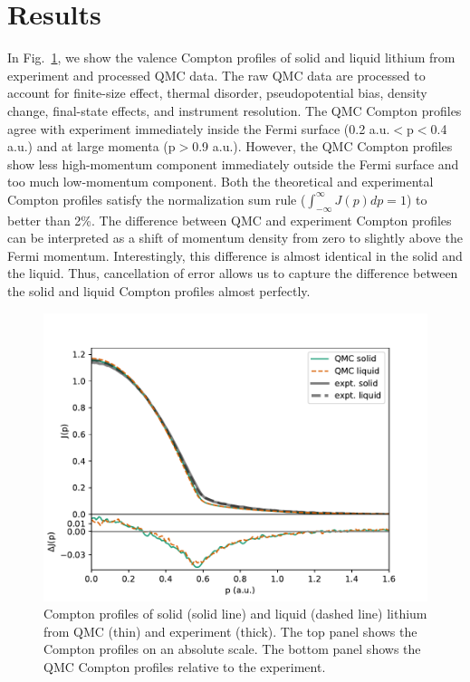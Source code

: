 \documentclass[aps,prb,showpacs,preprintnumbers,amsmath,amssymb,superscriptaddress,twocolumn]{revtex4-1}
\begin{document}
\section{Results} \label{sec:results}

In Fig.~\ref{fig:sl-jp-djp}, we show the valence Compton profiles of solid and liquid lithium from experiment and processed QMC data. The raw QMC data are processed to account for finite-size effect, thermal disorder, pseudopotential bias, density change, final-state effects, and instrument resolution. The QMC Compton profiles agree with experiment immediately inside the Fermi surface (0.2 a.u.$<$p$<$0.4 a.u.) and at large momenta (p$>$0.9  a.u.). However, the QMC Compton profiles show less high-momentum component immediately outside the Fermi surface and too much low-momentum component. Both the theoretical and experimental Compton profiles satisfy the normalization sum rule ($\int_{-\infty}^{\infty} J(p)dp=1$) to better than 2\%. The difference between QMC and experiment Compton profiles can be interpreted as a shift of momentum density from zero to slightly above the Fermi momentum. Interestingly, this difference is almost identical in the solid and the liquid. Thus, cancellation of error allows us to capture the difference between the solid and liquid Compton profiles almost perfectly.

\begin{figure}[h]
\includegraphics[width=\linewidth]{li58e_sl-jp}
\caption{Compton profiles of solid (solid line) and liquid (dashed line) lithium from QMC (thin) and experiment (thick). The top panel shows the Compton profiles on an absolute scale. The bottom panel shows the QMC Compton profiles relative to the experiment.\label{fig:sl-jp-djp}}
\end{figure}
\end{document}
